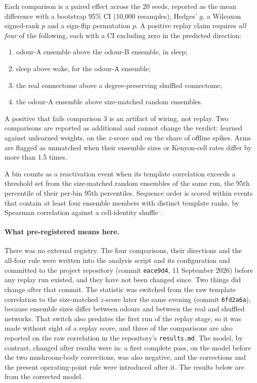 \documentclass[11pt]{article}
\begin{document}
Each comparison is a paired effect across the 20 seeds, reported as the mean difference with a bootstrap 95\% CI (10,000 resamples), Hedges' $g$, a Wilcoxon signed-rank $p$ and a sign-flip permutation $p$. A positive replay claim requires \emph{all four} of the following, each with a CI excluding zero in the predicted direction:
\begin{enumerate}\setlength\itemsep{1pt}
  \item odour-A ensemble above the odour-B ensemble, in sleep;
  \item sleep above wake, for the odour-A ensemble;
  \item the real connectome above a degree-preserving shuffled connectome;
  \item the odour-A ensemble above size-matched random ensembles.
\end{enumerate}
A positive that fails comparison 3 is an artifact of wiring, not replay. Two comparisons are reported as additional and cannot change the verdict: learned against unlearned weights, on the $z$-score and on the share of offline spikes. Arms are flagged as unmatched when their ensemble sizes or Kenyon-cell rates differ by more than 1.5 times.

A bin counts as a reactivation event when its template correlation exceeds a threshold set from the size-matched random ensembles of the same run, the 95th percentile of their per-bin 95th percentiles. Sequence order is scored within events that contain at least four ensemble members with distinct template ranks, by Spearman correlation against a cell-identity shuffle \citep{foster2006}.

\paragraph{What pre-registered means here.} There was no external registry. The four comparisons, their directions and the all-four rule were written into the analysis script and its configuration and committed to the project repository (commit \texttt{eace9d4}, 11 September 2026) before any replay run existed, and they have not been changed since. Two things did change after that commit. The statistic was switched from the raw template correlation to the size-matched $z$-score later the same evening (commit \texttt{6fd2a6a}), because ensemble sizes differ between odours and between the real and shuffled networks. That switch also predates the first run of the replay stage, so it was made without sight of a replay score, and three of the comparisons are also reported on the raw correlation in the repository's \texttt{results.md}. The model, by contrast, changed after results were in: a first complete pass, on the model before the two mushroom-body corrections, was also negative, and the corrections and the present operating-point rule were introduced after it. The results below are from the corrected model.
\end{document}
